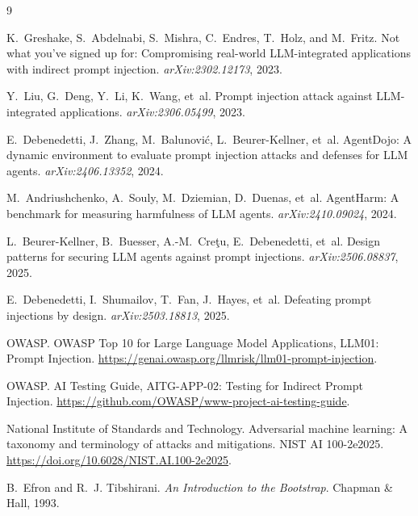 \documentclass[11pt]{article}
\begin{document}
\begin{thebibliography}{9}

K.~Greshake, S.~Abdelnabi, S.~Mishra, C.~Endres, T.~Holz, and M.~Fritz.
\newblock Not what you've signed up for: Compromising real-world LLM-integrated applications with indirect prompt injection.
\newblock \emph{arXiv:2302.12173}, 2023.

Y.~Liu, G.~Deng, Y.~Li, K.~Wang, et~al.
\newblock Prompt injection attack against LLM-integrated applications.
\newblock \emph{arXiv:2306.05499}, 2023.

E.~Debenedetti, J.~Zhang, M.~Balunovi\'{c}, L.~Beurer-Kellner, et~al.
\newblock AgentDojo: A dynamic environment to evaluate prompt injection attacks and defenses for LLM agents.
\newblock \emph{arXiv:2406.13352}, 2024.

M.~Andriushchenko, A.~Souly, M.~Dziemian, D.~Duenas, et~al.
\newblock AgentHarm: A benchmark for measuring harmfulness of LLM agents.
\newblock \emph{arXiv:2410.09024}, 2024.

L.~Beurer-Kellner, B.~Buesser, A.-M.~Cre\c{t}u, E.~Debenedetti, et~al.
\newblock Design patterns for securing LLM agents against prompt injections.
\newblock \emph{arXiv:2506.08837}, 2025.

E.~Debenedetti, I.~Shumailov, T.~Fan, J.~Hayes, et~al.
\newblock Defeating prompt injections by design.
\newblock \emph{arXiv:2503.18813}, 2025.

OWASP.
\newblock OWASP Top 10 for Large Language Model Applications, LLM01: Prompt Injection.
\newblock \url{https://genai.owasp.org/llmrisk/llm01-prompt-injection}.

OWASP.
\newblock AI Testing Guide, AITG-APP-02: Testing for Indirect Prompt Injection.
\newblock \url{https://github.com/OWASP/www-project-ai-testing-guide}.

National Institute of Standards and Technology.
\newblock Adversarial machine learning: A taxonomy and terminology of attacks and mitigations.
\newblock NIST AI 100-2e2025. \url{https://doi.org/10.6028/NIST.AI.100-2e2025}.

B.~Efron and R.~J. Tibshirani.
\newblock \emph{An Introduction to the Bootstrap}.
\newblock Chapman \& Hall, 1993.

\end{thebibliography}
\end{document}
